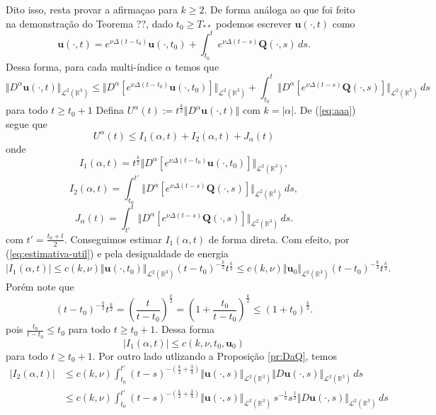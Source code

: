 \documentclass[a4paper, 11pt]{book}
\theoremstyle{definition}
\newcommand{\bR}{\mathbb{R}}
\newcommand{\bu}{\mathbf{u}}
\newcommand{\BQ}{\mathbf{Q}}
\newcommand{\cL}{\mathcal{L}}
\begin{document}
\begin{prf}
    Dito isso,  resta provar a afirmaçao para $k \geqslant 2$. De forma análoga ao que foi feito na demonstração do Teorema ??, dado $t_0 \geqslant T_{**}$ podemos escrever $\bu(\cdot,t)$ como
    \[
        \bu(\cdot,t) = e^{\nu \Delta(t-t_0)} \bu(\cdot,t_0) + \int_{t_0}^{t} e^{\nu \Delta (t-s)} \BQ(\cdot,s) \,ds.
    \]
    Dessa forma, para cada multi-índice $\alpha$ temos que
    \begin{equation} \label{eq:aaa}
        \Vert D^\alpha \bu(\cdot,t) \Vert_{\cL^2(\bR^3)} \leqslant \Vert D^\alpha [ e^{\nu \Delta(t-t_0)} \bu(\cdot,t_0)] \Vert_{\cL^2(\bR^3)} + \int_{t_0}^t \Vert D^\alpha [e^{\nu \Delta (t-s)} \BQ(\cdot,s)] \Vert_{\cL^2(\bR^3)} \,ds
    \end{equation}
    para todo $t \geqslant t_0 + 1$
    Defina $U^\alpha(t) := t^{\frac{k}{2}} \Vert D^\alpha \bu(\cdot,t) \Vert$ com $k = |\alpha|$.
    De (\ref{eq:aaa}) segue que
    \[
        U^\alpha(t) \leqslant I_1(\alpha,t) + I_2(\alpha,t) + J_\alpha(t)
    \]
    onde
    \[
        I_1(\alpha,t) = t^{\frac{k}{2}}\Vert D^\alpha [ e^{\nu \Delta(t-t_0)} \bu(\cdot,t_0)] \Vert_{\cL^2(\bR^3)},
    \]
    \[
        I_2(\alpha,t) = \int_{t_0}^{t'} \Vert D^\alpha [e^{\nu \Delta (t-s)} \BQ(\cdot,s)] \Vert_{\cL^2(\bR^3)} \,ds,
    \]
    \[
        J_\alpha(t) = \int_{t'}^t \Vert D^\alpha [e^{\nu \Delta (t-s)} \BQ(\cdot,s)] \Vert_{\cL^2(\bR^3)} \,ds.
    \]
    com $t' = \frac{t_0 + t}{2}$. Conseguimos estimar $I_1(\alpha, t)$ de forma direta.
    Com efeito, por (\ref{eq:estimativa-util}) e pela desigualdade de energia
    \[
        |I_1(\alpha,t)| \leqslant c(k,\nu) \Vert \bu(\cdot,t_0) \Vert_{\cL^2(\bR^3)} (t - t_0)^{-\frac{k}{2}} t^{\frac{k}{2}} \leqslant c(k, \nu) \Vert \bu_0 \Vert_{\cL^2(\bR^3)} (t - t_0)^{-\frac{k}{2}} t^{\frac{k}{2}}.
    \]
    Porém note que
    \[
        (t - t_0)^{-\frac{k}{2}} t^{\frac{k}{2}} = \left( \frac{t}{t - t_0} \right)^{\! \frac{k}{2}} = \left( 1 + \frac{t_0}{t - t_0} \right)^{\! \frac{k}{2}} \leqslant (1 + t_0)^{\frac{k}{2}}.
    \]
    pois $\frac{t_0}{t - t_0} \leqslant t_0$ para todo $t \geqslant t_0 + 1$. Dessa forma
    \[
        |I_1(\alpha,t)| \leqslant c(k,\nu,t_0,\bu_0)
    \]
    para todo $t \geqslant t_0 + 1$. Por outro lado utlizando a Proposição \ref{pr:DaQ}, temos
    \[
        \begin{aligned}
            |I_2(\alpha,t)| &\leqslant c(k,\nu) \int_{t_0}^{t'} (t-s)^{-\left( \frac{k}{2} + \frac{3}{4} \right)} \Vert \bu(\cdot,s) \Vert_{\cL^2(\bR^3)} \Vert D\bu(\cdot,s) \Vert_{\cL^2(\bR^3)} \,ds\\
            &\leqslant c(k,\nu) \int_{t_0}^{t'} (t-s)^{-\left( \frac{k}{2} + \frac{3}{4} \right)} \Vert \bu(\cdot,s) \Vert_{\cL^2(\bR^3)} \, s^{-\frac{1}{2}} s^{\frac{1}{2}} \Vert D\bu(\cdot,s) \Vert_{\cL^2(\bR^3)} \,ds

\end{aligned}\]
\end{prf}
\end{document}
